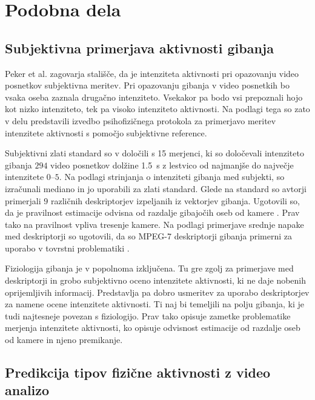 \section{Podobna dela}\label{sec:podobna-dela}



\subsection{Subjektivna primerjava aktivnosti gibanja}\label{sec:subjektivna-primerjava}

Peker et al. \cite{peker2004framework} zagovarja stališče, da je intenziteta aktivnosti pri opazovanju video posnetkov subjektivna meritev. Pri opazovanju gibanja v video posnetkih bo vsaka oseba zaznala drugačno intenziteto. Vsekakor pa bodo vsi prepoznali hojo kot nizko intenziteto, tek pa visoko intenziteto aktivnosti. Na podlagi tega so zato v delu \cite{peker2004framework} predstavili izvedbo psihofizičnega protokola za primerjavo meritev intenzitete aktivnosti s pomočjo subjektivne reference.

Subjektivni zlati standard so v \cite{peker2004framework} določili s 15 merjenci, ki so določevali intenziteto gibanja $294$ video posnetkov dolžine \SI{1.5}{\s} z lestvico od najmanjše do največje intenzitete $0$--$5$. Na podlagi strinjanja o intenziteti gibanja med subjekti, so izračunali mediano in jo uporabili za zlati standard. Glede na standard so avtorji \cite{peker2004framework} primerjali $9$ različnih deskriptorjev izpeljanih iz vektorjev gibanja. Ugotovili so, da je pravilnost estimacije odvisna od razdalje gibajočih oseb od kamere \cite{peker2004framework}. Prav tako na pravilnost vpliva tresenje kamere. Na podlagi primerjave srednje napake med deskriptorji so ugotovili, da so MPEG-7 deskriptorji gibanja primerni za uporabo v tovrstni problematiki \cite{peker2004framework}.

Fiziologija gibanja je v \cite{peker2004framework} popolnoma izključena. Tu gre zgolj za primerjave med deskriptorji in grobo subjektivno oceno intenzitete aktivnosti, ki ne daje nobenih oprijemljivih informacij. Predstavlja pa dobro usmeritev za uporabo deskriptorjev za namene ocene intenzitete aktivnosti. Ti naj bi temeljili na polju gibanja, ki je tudi najtesneje povezan s fiziologijo. Prav tako opisuje zametke problematike merjenja intenzitete aktivnosti, ko opisuje odvisnost estimacije od razdalje oseb od kamere in njeno premikanje.




\subsection{Predikcija tipov fizične aktivnosti z video analizo}

